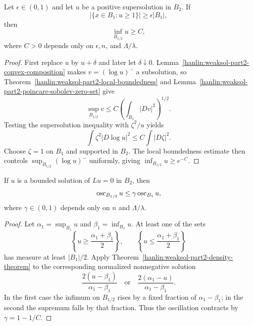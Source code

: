 \begin{theorem}\label{hanlin:weaksol-part2-density-theorem}
Let $\epsilon\in(0,1)$ and let $u$ be a positive supersolution in $B_2$.
If
\[
|\{x\in B_1:u\geq1\}|\geq\epsilon|B_1|,
\]
then
\[
\inf_{B_{1/2}}u\geq C,
\]
where $C>0$ depends only on $\epsilon,n$, and $\Lambda/\lambda$.
\end{theorem}
\begin{proof}
\sketch First replace $u$ by $u+\delta$ and later let $\delta\downarrow0$.
Lemma~\ref{hanlin:weaksol-part2-convex-composition} makes
$v=(\log u)^-$ a subsolution, so
Theorem~\ref{hanlin:weaksol-part2-local-boundedness} and
Lemma~\ref{hanlin:weaksol-part2-poincare-sobolev-zero-set} give
\begin{equation}
\sup_{B_{1/2}}v
\leq C\left(\int_{B_1}|Dv|^2\right)^{1/2}.
\end{equation}
Testing the supersolution inequality with $\zeta^2/u$ yields
\[
\int\zeta^2|D\log u|^2\leq C\int|D\zeta|^2.
\]
Choose $\zeta=1$ on $B_1$ and supported in $B_2$. The local boundedness
estimate then controls
$\sup_{B_{1/2}}(\log u)^-$ uniformly, giving
$\inf_{B_{1/2}}u\geq e^{-C}$.
\end{proof}

\begin{theorem}\label{hanlin:weaksol-part2-oscillation-decay}
If $u$ is a bounded solution of $Lu=0$ in $B_2$, then
\[
\operatorname{osc}_{B_{1/2}}u\leq\gamma\operatorname{osc}_{B_1}u,
\]
where $\gamma\in(0,1)$ depends only on $n$ and $\Lambda/\lambda$.
\end{theorem}
\begin{proof}
\sketch Let $\alpha_1=\sup_{B_1}u$ and $\beta_1=\inf_{B_1}u$. At least
one of the sets
\[
\left\{u\geq\frac{\alpha_1+\beta_1}{2}\right\},
\qquad
\left\{u\leq\frac{\alpha_1+\beta_1}{2}\right\}
\]
has measure at least $|B_1|/2$. Apply
Theorem~\ref{hanlin:weaksol-part2-density-theorem} to the corresponding
normalized nonnegative solution
\[
\frac{2(u-\beta_1)}{\alpha_1-\beta_1}
\quad\text{or}\quad
\frac{2(\alpha_1-u)}{\alpha_1-\beta_1}.
\]
In the first case the infimum on $B_{1/2}$ rises by a fixed fraction of
$\alpha_1-\beta_1$; in the second the supremum falls by that fraction.
Thus the oscillation contracts by $\gamma=1-1/C$.
\end{proof}


